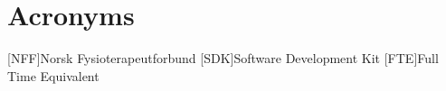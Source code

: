 \chapter*{Acronyms}
\begin{acronym}
[NFF]{Norsk Fysioterapeutforbund}
[SDK]{Software Development Kit}
[FTE]{Full Time Equivalent}
\end{acronym}

